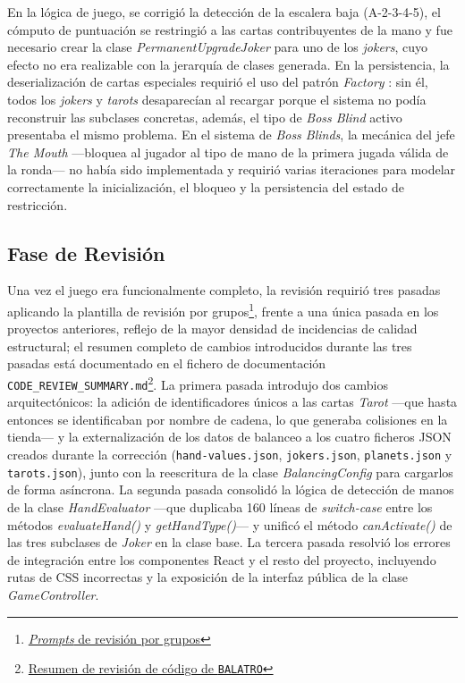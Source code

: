 En la lógica de juego, se corrigió la detección de la escalera baja (A-2-3-4-5), el cómputo de puntuación se restringió a las cartas contribuyentes de la mano y fue necesario crear la clase \textit{PermanentUpgradeJoker} para uno de los \textit{jokers}, cuyo efecto no era realizable con la jerarquía de clases generada. En la persistencia, la deserialización de cartas especiales requirió el uso del patrón \textit{Factory} \cite{Chochlik:2016:Factory}: sin él, todos los \textit{jokers} y \textit{tarots} desaparecían al recargar porque el sistema no podía reconstruir las subclases concretas, además, el tipo de \textit{Boss Blind} activo presentaba el mismo problema. En el sistema de \textit{Boss Blinds}, la mecánica del jefe \textit{The Mouth} ---bloquea al jugador al tipo de mano de la primera jugada válida de la ronda--- no había sido implementada y requirió varias iteraciones para modelar correctamente la inicialización, el bloqueo y la persistencia del estado de restricción.

\subsection{Fase de Revisión}

Una vez el juego era funcionalmente completo, la revisión requirió tres pasadas aplicando la plantilla de revisión por grupos\footnote{\href{https://github.com/alu0101549491/TFG-Fabian-Gonzalez-Lence/tree/main/resources/prompts/3-MiniBalatro/4-RevisionPorGrupodeModulos}{\textit{Prompts} de revisión por grupos}}, frente a una única pasada en los proyectos anteriores, reflejo de la mayor densidad de incidencias de calidad estructural; el resumen completo de cambios introducidos durante las tres pasadas está documentado en el fichero de documentación \texttt{CODE\_REVIEW\_SUMMARY.md}\footnote{\href{https://github.com/alu0101549491/TFG-Fabian-Gonzalez-Lence/blob/main/projects/3-MiniBalatro/docs/CODE_REVIEW_SUMMARY.md}{Resumen de revisión de código de \texttt{BALATRO}}}. La primera pasada introdujo dos cambios arquitectónicos: la adición de identificadores únicos a las cartas \textit{Tarot} ---que hasta entonces se identificaban por nombre de cadena, lo que generaba colisiones en la tienda--- y la externalización de los datos de balanceo a los cuatro ficheros JSON creados durante la corrección (\texttt{hand-values.json}, \texttt{jokers.json}, \texttt{planets.json} y \texttt{tarots.json}), junto con la reescritura de la clase \textit{BalancingConfig} para cargarlos de forma asíncrona. La segunda pasada consolidó la lógica de detección de manos de la clase \textit{HandEvaluator} ---que duplicaba 160 líneas de \textit{switch-case} entre los métodos \textit{evaluateHand()} y \textit{getHandType()}--- y unificó el método \textit{canActivate()} de las tres subclases de \textit{Joker} en la clase base. La tercera pasada resolvió los errores de integración entre los componentes React y el resto del proyecto, incluyendo rutas de CSS incorrectas y la exposición de la interfaz pública de la clase \textit{GameController}.


